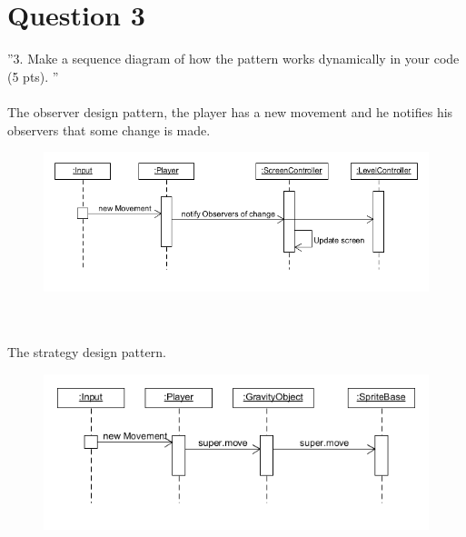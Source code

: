 \section{Question 3}

''3. Make a sequence diagram of how the pattern works dynamically in your code (5 pts). ''
\\
\\
The observer design pattern, the player has a new movement and he notifies his observers that some change is made.
\begin{figure}[h]
\includegraphics[width=\textwidth]{sequenceDiagramObserver}
\end{figure}
\\
\\
The strategy design pattern.
\begin{figure}[h]
\includegraphics[width=\textwidth]{sequenceDiagramStrategy}
\end{figure}
